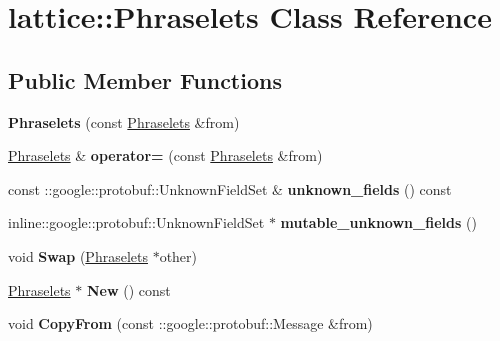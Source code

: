 \hypertarget{classlattice_1_1Phraselets}{
\section{lattice::Phraselets Class Reference}
\label{classlattice_1_1Phraselets}
}
\subsection*{Public Member Functions}
\begin{DoxyCompactItemize}
\item 
\hypertarget{classlattice_1_1Phraselets_ab7dd94e765222f9afd3ddc6aae28f4b9}{
{\bfseries Phraselets} (const \hyperlink{classlattice_1_1Phraselets}{Phraselets} \&from)}
\label{classlattice_1_1Phraselets_ab7dd94e765222f9afd3ddc6aae28f4b9}

\item 
\hypertarget{classlattice_1_1Phraselets_ab7fc4048a36fb485457156b33d201f0f}{
\hyperlink{classlattice_1_1Phraselets}{Phraselets} \& {\bfseries operator=} (const \hyperlink{classlattice_1_1Phraselets}{Phraselets} \&from)}
\label{classlattice_1_1Phraselets_ab7fc4048a36fb485457156b33d201f0f}

\item 
\hypertarget{classlattice_1_1Phraselets_a2139960d920a5bc3aa8b93eee034a5f3}{
const ::google::protobuf::UnknownFieldSet \& {\bfseries unknown\_\-fields} () const }
\label{classlattice_1_1Phraselets_a2139960d920a5bc3aa8b93eee034a5f3}

\item 
\hypertarget{classlattice_1_1Phraselets_a30f7480fb64d1b726d53ee8bea076b72}{
inline::google::protobuf::UnknownFieldSet $\ast$ {\bfseries mutable\_\-unknown\_\-fields} ()}
\label{classlattice_1_1Phraselets_a30f7480fb64d1b726d53ee8bea076b72}

\item 
\hypertarget{classlattice_1_1Phraselets_af2b24704a495960845fe4e4c2188a53f}{
void {\bfseries Swap} (\hyperlink{classlattice_1_1Phraselets}{Phraselets} $\ast$other)}
\label{classlattice_1_1Phraselets_af2b24704a495960845fe4e4c2188a53f}

\item 
\hypertarget{classlattice_1_1Phraselets_a5ea53d62706cba1414a5121a40251606}{
\hyperlink{classlattice_1_1Phraselets}{Phraselets} $\ast$ {\bfseries New} () const }
\label{classlattice_1_1Phraselets_a5ea53d62706cba1414a5121a40251606}

\item 
\hypertarget{classlattice_1_1Phraselets_ae545b608108f883959885ca212ba9c47}{
void {\bfseries CopyFrom} (const ::google::protobuf::Message \&from)}
\label{classlattice_1_1Phraselets_ae545b608108f883959885ca212ba9c47}


\end{DoxyCompactItemize}
